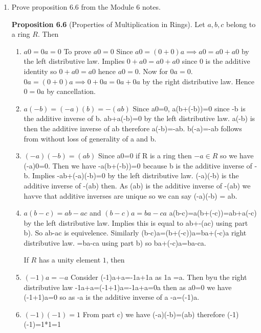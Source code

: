 \documentclass{article}
\begin{document}


\begin{enumerate}

   \item Prove proposition 6.6 from the Module 6 notes.
    
        \textbf{Proposition 6.6} (Properties of Multiplication in Rings). Let $a,b,c$ belong to a ring $R$. Then 
            \begin{enumerate}
                \item $a0=0a=0$ 
To prove $a0=0$ Since $a0=(0+0)a \implies a0=a0+a0$ by the left distributive law. Implies $0+a0=a0 +a0$ since 0 is the additive identity so $0+a0=a0$ hence $a0=0$. Now for $0a=0$. $0a =(0+0)a \implies 0+0a=0a+0a$ by the right distributive law. Hence $0=0a$ by cancellation. 
                \item $a(-b)=(-a)(b)=-(ab)$
Since a0=0, a(b+(-b))=0 since -b is the additive inverse of b. ab+a(-b)=0 by the left distributive law. a(-b) is then the additive inverse of ab therefore a(-b)=-ab. b(-a)=-ab follows from without loss of generality of a and b. 
                \item $(-a)(-b)=(ab)$
Since a0=0 if R is a ring then $-a\in R$ so we have (-a)0=0. Then we have -a(b+(-b))=0 because b is the additive inverse of -b. Implies -ab+(-a)(-b)=0 by the left distributive law. (-a)(-b) is the additive inverse of -(ab) then. As (ab) is the additive inverse of -(ab) we havve that additive inverses are unique so we can say (-a)(-b) = ab.
                \item $a(b-c)=ab-ac$ and $(b-c)a=ba-ca$
     a(b-c)=a(b+(-c))=ab+a(-c) by the left distributive law. Implies this is equal to ab+-(ac) using part b). So ab-ac is equivelence. Similarly (b-c)a=(b+(-c))a=ba+(-c)a right distributive law. =ba-ca using part b) so ba+(-c)a=ba-ca.
                
            \hspace{-2em}If $R$ has a unity element $1$, then 
                \item $(-1)a=-a$
Consider (-1)a+a=-1a+1a as 1a =a. Then byu the right distributive law -1a+a=(-1+1)a=-1a+a=0a then as a0=0 we have (-1+1)a=0 so as -a is the additive inverse of a -a=(-1)a.
                \item $(-1)(-1)=1$
From part c) we have (-a)(-b)=(ab) therefore (-1)(-1)=1*1=1
                \vspace*{2em}
            \end{enumerate}


\end{enumerate}
\end{document}
